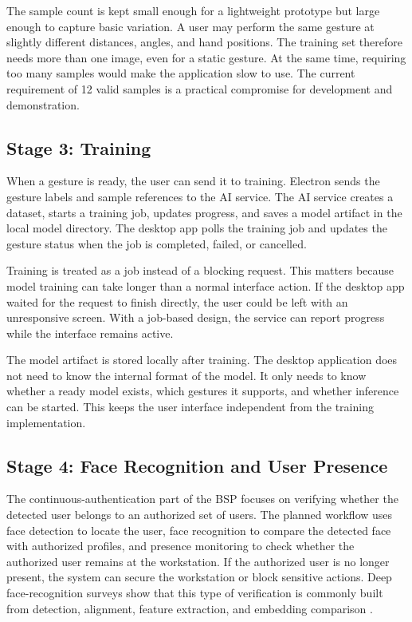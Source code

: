 \documentclass[10pt,twocolumn]{article}
\begin{document}
The sample count is kept small enough for a lightweight prototype but large enough to capture basic variation.
A user may perform the same gesture at slightly different distances, angles, and hand positions.
The training set therefore needs more than one image, even for a static gesture.
At the same time, requiring too many samples would make the application slow to use.
The current requirement of 12 valid samples is a practical compromise for development and demonstration.

\subsection{Stage 3: Training}
When a gesture is ready, the user can send it to training.
Electron sends the gesture labels and sample references to the AI service.
The AI service creates a dataset, starts a training job, updates progress, and saves a model artifact in the local model directory.
The desktop app polls the training job and updates the gesture status when the job is completed, failed, or cancelled.

Training is treated as a job instead of a blocking request.
This matters because model training can take longer than a normal interface action.
If the desktop app waited for the request to finish directly, the user could be left with an unresponsive screen.
With a job-based design, the service can report progress while the interface remains active.

The model artifact is stored locally after training.
The desktop application does not need to know the internal format of the model.
It only needs to know whether a ready model exists, which gestures it supports, and whether inference can be started.
This keeps the user interface independent from the training implementation.

\subsection{Stage 4: Face Recognition and User Presence}
The continuous-authentication part of the BSP focuses on verifying whether the detected user belongs to an authorized set of users.
The planned workflow uses face detection to locate the user, face recognition to compare the detected face with authorized profiles, and presence monitoring to check whether the authorized user remains at the workstation.
If the authorized user is no longer present, the system can secure the workstation or block sensitive actions.
Deep face-recognition surveys show that this type of verification is commonly built from detection, alignment, feature extraction, and embedding comparison \cite{wang2018deepface,wang2022surveyface}.
\end{document}
